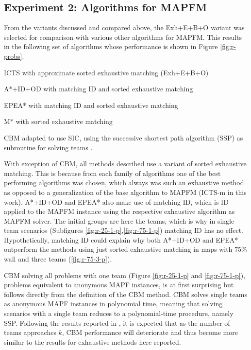 \documentclass[english]{article}
\begin{document}
	\subsection{Experiment 2: Algorithms for MAPFM}
	From the variants discussed and compared above, the Exh+E+B+O variant was selected for comparison with various other algorithms for MAPFM. This results in the following set of algorithms whose performance is shown in Figure \ref{fig:r-probs}.
	\begin{itemize}
		\begin{minipage}{0.45\linewidth}
			\item ICTS with approximate sorted exhaustive matching (Exh+E+B+O)
			\item A*+ID+OD with matching ID and sorted exhaustive matching \cite{bruin2021}
			\item EPEA* with matching ID and sorted exhaustive matching \cite{jong2021}
		\end{minipage}
		\hspace{1cm}
		\begin{minipage}{0.40\linewidth}
			\item M* with sorted exhaustive matching \cite{donszelmann2021}
			\item CBM adapted to use SIC, using the successive shortest path algorithm (SSP) \cite{goldberg1987} as subroutine for solving teams \cite{baauw2021}.
		\end{minipage}
	\end{itemize}
	With exception of CBM, all methods described use a variant of sorted exhaustive matching. This is because from each family of algorithms one of the best performing algorithms was chosen, which always was such an exhaustive method as opposed to a generalization of the base algorithm to MAPFM (ICTS-m in this work). A*+ID+OD and EPEA* also make use of matching ID, which is ID applied to the MAPFM instance using the respective exhaustive algorithm as MAPFM solver. The initial groups are here the teams, which is why in single team scenarios (Subfigures \ref{fig:r-25-1-p},\ref{fig:r-75-1-p}) matching ID has no effect. Hypothetically, matching ID could explain why both A*+ID+OD and EPEA* outperform the methods using just sorted exhaustive matching in maps with 75\% wall and three teams (\ref{fig:r-75-3-p}).
	
	CBM solving all problems with one team (Figure \ref{fig:r-25-1-p} and \ref{fig:r-75-1-p}), problems equivalent to anonymous MAPF instances, is at first surprising but follows directly from the definition of the CBM method. CBM solves single teams as anonymous MAPF instances in polynomial time, meaning that solving scenarios with a single team reduces to a polynomial-time procedure, namely SSP. Following the results reported in \cite{ma2016}, it is expected that as the number of teams approaches $k$, CBM performance will deteriorate and thus become more similar to the results for exhaustive methods here reported.
\end{document}
